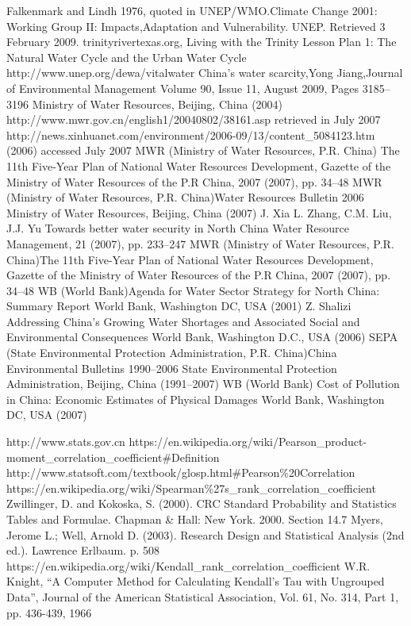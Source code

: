 \begin{thebibliography}{99}
   {Falkenmark and Lindh 1976, quoted in UNEP/WMO.Climate Change 2001: Working Group II: Impacts,Adaptation and Vulnerability. UNEP. Retrieved 3 February 2009.}
   trinityrivertexas.org, Living with the Trinity Lesson Plan 1: The Natural Water Cycle and the Urban Water Cycle
   http://www.unep.org/dewa/vitalwater
   China's water scarcity,Yong Jiang,Journal of Environmental Management Volume 90, Issue 11, August 2009, Pages 3185–3196
   Ministry of Water Resources, Beijing, China (2004) http://www.mwr.gov.cn/english1/20040802/38161.asp retrieved in July 2007
   http://news.xinhuanet.com/environment/2006-09/13/content\_5084123.htm (2006) accessed July 2007
  MWR (Ministry of Water Resources, P.R. China) The 11th Five-Year Plan of National Water Resources Development, Gazette of the Ministry of Water Resources of the P.R China, 2007 (2007), pp. 34–48
  MWR (Ministry of Water Resources, P.R. China)Water Resources Bulletin 2006 Ministry of Water Resources, Beijing, China (2007)
  J. Xia L. Zhang, C.M. Liu, J.J. Yu Towards better water security in North China Water Resource Management, 21 (2007), pp. 233–247
   MWR (Ministry of Water Resources, P.R. China)The 11th Five-Year Plan of National Water Resources Development, Gazette of the Ministry of Water Resources of the P.R China, 2007 (2007), pp. 34–48
   WB (World Bank)Agenda for Water Sector Strategy for North China: Summary Report World Bank, Washington DC, USA (2001)
   Z. Shalizi Addressing China's Growing Water Shortages and Associated Social and Environmental Consequences World Bank, Washington D.C., USA (2006)
   SEPA (State Environmental Protection Administration, P.R. China)China Environmental Bulletins 1990–2006 State Environmental Protection Administration, Beijing, China (1991–2007)
  WB (World Bank) Cost of Pollution in China: Economic Estimates of Physical Damages World Bank, Washington DC, USA (2007)

   http://www.stats.gov.cn
   https://en.wikipedia.org/wiki/Pearson\_product-moment\_correlation\_coefficient\#Definition
   http://www.statsoft.com/textbook/glosp.html\#Pearson\%20Correlation
   https://en.wikipedia.org/wiki/Spearman\%27s\_rank\_correlation\_coefficient
   Zwillinger, D. and Kokoska, S. (2000). CRC Standard Probability and Statistics Tables and Formulae. Chapman \& Hall: New York. 2000. Section 14.7
   Myers, Jerome L.; Well, Arnold D. (2003). Research Design and Statistical Analysis (2nd ed.). Lawrence Erlbaum. p. 508
   https://en.wikipedia.org/wiki/Kendall\_rank\_correlation\_coefficient
   W.R. Knight, “A Computer Method for Calculating Kendall’s Tau with Ungrouped Data”, Journal of the American Statistical Association, Vol. 61, No. 314, Part 1, pp. 436-439, 1966

\end{thebibliography}


